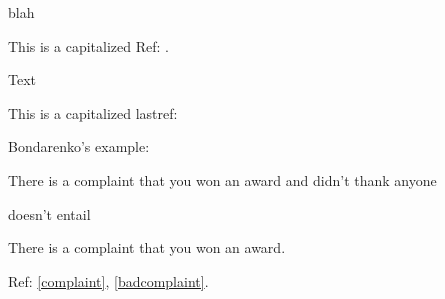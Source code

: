 \documentclass[leqno, 10pt, twocolumn]{article}
\begin{document}
\begin{prop}
    \pitem[Predicate Modification Theory, ref format={the #1}] \label{pmt} \leavevmode
    \begin{prop}
        \bitem
        blah
    \end{prop}
\end{prop}

This is a capitalized Ref: .

\begin{prop}
    \pitem[something]
    Text
\end{prop}
This is a capitalized lastref: \Lastref{} 

Bondarenko's example:
\begin{prop}
    \pitem
    \begin{prop}
        \pitem \label{complaint}
        There is a complaint that you won an award and didn't thank anyone
    \end{prop}
\end{prop}
doesn't entail
\begin{prop}
    \item
    \begin{prop}
        \pitem \label{badcomplaint}
        There is a complaint that you won an award.
    \end{prop}
\end{prop}
Ref: \ref{complaint}, \ref{badcomplaint}.
\end{document}
